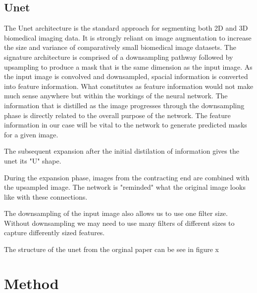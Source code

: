 \documentclass[12pt]{article}
\begin{document}
\subsection{Unet}
The Unet architecture is the standard approach for segmenting both 2D and 3D biomedical imaging data.
It is strongly reliant on image augmentation to increase the size and variance of comparatively small biomedical image datasets.
The signature architecture is comprised of a downsampling pathway followed by upsampling to produce a mask that is the same dimension as the input image.
As the input image is convolved and downsampled, spacial information is converted into feature information.
What constitutes as feature information would not make much sense anywhere but within the workings of the neural network.
The information that is distilled as the image progresses through the downsampling phase is directly related to the overall purpose of the network. 
The feature information in our case will be vital to the network to generate predicted masks for a given image.

The subsequent expansion after the initial distilation of information gives the unet its "U" shape.

During the expansion phase, images from the contracting end are combined with the upsampled image.
The network is "reminded" what the original image looks like with these connections.

The downsampling of the input image also allows us to use one filter size.
Without downsampling we may need to use many filters of different sizes to capture differently sized features.

The structure of the unet from the orginal paper can be see in figure x


\section{Method}
\end{document}
